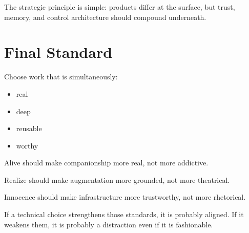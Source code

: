 \documentclass[11pt]{article}
\begin{document}
The strategic principle is simple: products differ at the surface, but trust, memory, and control architecture should compound underneath.

\section{Final Standard}

Choose work that is simultaneously:

\begin{itemize}
  \item real
  \item deep
  \item reusable
  \item worthy
\end{itemize}

Alive should make companionship more real, not more addictive.

Realize should make augmentation more grounded, not more theatrical.

Innocence should make infrastructure more trustworthy, not more rhetorical.

If a technical choice strengthens those standards, it is probably aligned. If it weakens them, it is probably a distraction even if it is fashionable.
\end{document}

